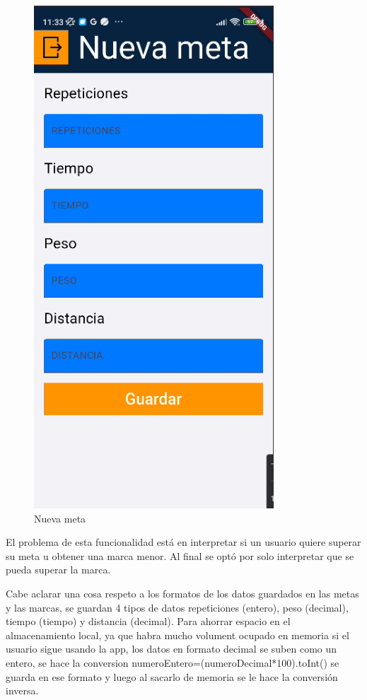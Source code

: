 \begin{figure}[H]
   \centering
    \includegraphics[width=0.8\textwidth]{pantallas/NuevaMeta.png}
    \caption{Nueva meta}
    \label{fig:NuevaMeta}
\end{figure}

El problema de esta funcionalidad está en interpretar si un usuario quiere superar su meta u obtener una marca menor. Al final se optó por solo interpretar que se pueda superar la marca.

Cabe aclarar una cosa respeto a los formatos de los datos guardados en las metas y las marcas, se guardan 4 tipos de datos repeticiones (entero), peso (decimal), tiempo (tiempo) y distancia (decimal). Para ahorrar espacio en el almacenamiento local, ya que habra mucho volument ocupado en memoria si el usuario sigue usando la app, los datos en formato decimal se suben como un entero, se hace la conversion numeroEntero=(numeroDecimal*100).toInt() se guarda en ese formato y luego al sacarlo de memoria se le hace la conversión inversa.

